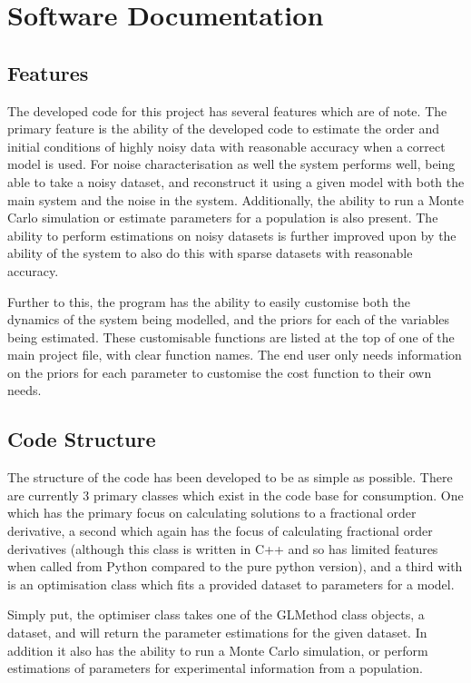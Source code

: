 \section{Software Documentation}

\subsection{Features}

The developed code for this project has several features which are of note. The primary feature is the ability of the developed code to estimate the order and initial conditions of highly noisy data with reasonable accuracy when a correct model is used. For noise characterisation as well the system performs well, being able to take a noisy dataset, and reconstruct it using a given model with both the main system and the noise in the system. Additionally, the ability to run a Monte Carlo simulation or estimate parameters for a population is also present. The ability to perform estimations on noisy datasets is further improved upon by the ability of the system to also do this with sparse datasets with reasonable accuracy.

Further to this, the program has the ability to easily customise both the dynamics of the system being modelled, and the priors for each of the variables being estimated. These customisable functions are listed at the top of one of the main project file, with clear function names. The end user only needs information on the priors for each parameter to customise the cost function to their own needs.

\subsection{Code Structure} \label{code_structure}

The structure of the code has been developed to be as simple as possible. There are currently 3 primary classes which exist in the code base for consumption. One which has the primary focus on calculating solutions to a fractional order derivative, a second which again has the focus of calculating fractional order derivatives (although this class is written in C++ and so has limited features when called from Python compared to the pure python version), and a third with is an optimisation class which fits a provided dataset to parameters for a model. 

Simply put, the optimiser class takes one of the GLMethod class objects, a dataset, and will return the parameter estimations for the given dataset. In addition it also has the ability to run a Monte Carlo simulation, or perform estimations of parameters for experimental information from a population.

